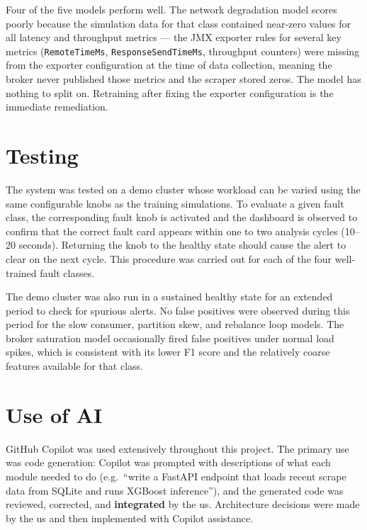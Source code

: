 \documentclass[12pt, a4paper]{article}
\begin{document}
Four of the five models perform well. The network degradation model scores
poorly because the simulation data for that class contained near-zero values for
all latency and throughput metrics --- the JMX exporter rules for several key
metrics (\texttt{RemoteTimeMs}, \texttt{ResponseSendTimeMs}, throughput counters)
were missing from the exporter configuration at the time of data collection,
meaning the broker never published those metrics and the scraper stored zeros.
The model has nothing to split on. Retraining after fixing the exporter
configuration is the immediate remediation.

\section{Testing}

The system was tested on a demo cluster whose workload can be varied using the
same configurable knobs as the training simulations. To evaluate a given fault
class, the corresponding fault knob is activated and the dashboard is observed
to confirm that the correct fault card appears within one to two analysis cycles
(10--20 seconds). Returning the knob to the healthy state should cause the
alert to clear on the next cycle. This procedure was carried out for each of the
four well-trained fault classes.

The demo cluster was also run in a sustained healthy state for an extended
period to check for spurious alerts. No false positives were observed during
this period for the slow consumer, partition skew, and rebalance loop models.
The broker saturation model occasionally fired false positives under normal
load spikes, which is consistent with its lower F1 score and the relatively
coarse features available for that class.

\section{Use of AI}

GitHub Copilot was used extensively throughout this project. The primary use was
code generation: Copilot was prompted with descriptions of what each module
needed to do (e.g.\ ``write a FastAPI endpoint that loads recent scrape data
from SQLite and runs XGBoost inference''), and the generated code was reviewed,
corrected, and \textbf{integrated} by the us. Architecture decisions were made by 
the us and then implemented with Copilot assistance.
\end{document}
